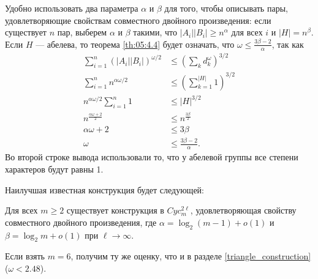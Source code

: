 Удобно использовать два параметра $\alpha$ и $\beta$ для того, чтобы описывать пары, удовлетворяющие свойствам совместного двойного произведения: если существует $n$ пар, выберем $\alpha$ и $\beta$ такими, что $|A_i||B_i| \geq n^\alpha$ для всех $i$ и $|H|=n^\beta$. Если $H$ --- абелева, то теорема \ref{th:05:4.4} будет означать, что $\omega \leq \frac{3\beta - 2}{\alpha}$, так как
\begin{align*}
	\sum_{i=1}^{n} (|A_i||B_i|)^{\omega/2} & \leq \left( \sum_{k} d_k^\omega  \right)^{3/2} \\
	\sum_{i=1}^{n} n^{\alpha \omega/2} & \leq \left( \sum_{k=1}^{|H|} 1  \right)^{3/2}\\
	n^{\alpha \omega/2} \sum_{i=1}^{n} 1 & \leq |H|^{3/2} \\
	n^{\frac{\alpha \omega + 2}{2}}	& \leq n^{\frac{3 \beta}{2}} \\
	\alpha \omega + 2 & \leq 3 \beta \\
	\omega & \leq \frac{3\beta - 2}{\alpha}.
\end{align*}
Во второй строке вывода использовали то, что у абелевой группы все степени характеров будут равны 1.

Наилучшая известная конструкция будет следующей:
\begin{prop}\label{prop:05:4.5}
  Для всех $m \geq 2$ существует конструкция в $Cyc_m^{2 \ell}$, удовлетворяющая свойству совместного двойного произведения, где $\alpha=\log_2(m-1)+o(1)$ и $\beta=\log_2 m+o(1)$ при $\ell \to \infty$.
\end{prop}

Если взять $m=6$, получим ту же оценку, что и в разделе \ref{triangle_construction} ($\omega < 2.48$).

